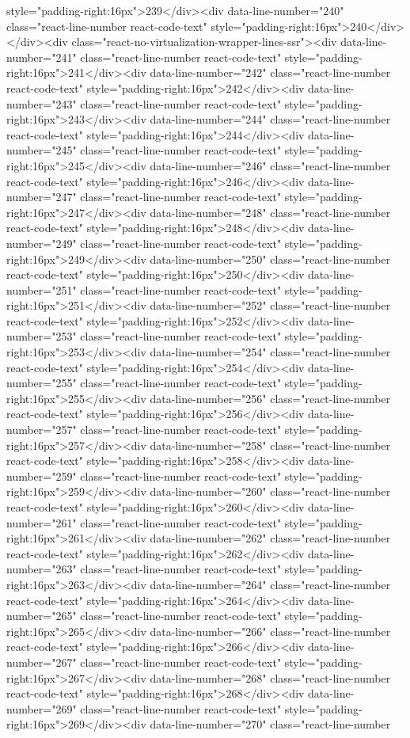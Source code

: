 {{{{{style="padding-right:16px">239</div><div data-line-number="240" class="react-line-number react-code-text" style="padding-right:16px">240</div></div><div class="react-no-virtualization-wrapper-lines-ssr"><div data-line-number="241" class="react-line-number react-code-text" style="padding-right:16px">241</div><div data-line-number="242" class="react-line-number react-code-text" style="padding-right:16px">242</div><div data-line-number="243" class="react-line-number react-code-text" style="padding-right:16px">243</div><div data-line-number="244" class="react-line-number react-code-text" style="padding-right:16px">244</div><div data-line-number="245" class="react-line-number react-code-text" style="padding-right:16px">245</div><div data-line-number="246" class="react-line-number react-code-text" style="padding-right:16px">246</div><div data-line-number="247" class="react-line-number react-code-text" style="padding-right:16px">247</div><div data-line-number="248" class="react-line-number react-code-text" style="padding-right:16px">248</div><div data-line-number="249" class="react-line-number react-code-text" style="padding-right:16px">249</div><div data-line-number="250" class="react-line-number react-code-text" style="padding-right:16px">250</div><div data-line-number="251" class="react-line-number react-code-text" style="padding-right:16px">251</div><div data-line-number="252" class="react-line-number react-code-text" style="padding-right:16px">252</div><div data-line-number="253" class="react-line-number react-code-text" style="padding-right:16px">253</div><div data-line-number="254" class="react-line-number react-code-text" style="padding-right:16px">254</div><div data-line-number="255" class="react-line-number react-code-text" style="padding-right:16px">255</div><div data-line-number="256" class="react-line-number react-code-text" style="padding-right:16px">256</div><div data-line-number="257" class="react-line-number react-code-text" style="padding-right:16px">257</div><div data-line-number="258" class="react-line-number react-code-text" style="padding-right:16px">258</div><div data-line-number="259" class="react-line-number react-code-text" style="padding-right:16px">259</div><div data-line-number="260" class="react-line-number react-code-text" style="padding-right:16px">260</div><div data-line-number="261" class="react-line-number react-code-text" style="padding-right:16px">261</div><div data-line-number="262" class="react-line-number react-code-text" style="padding-right:16px">262</div><div data-line-number="263" class="react-line-number react-code-text" style="padding-right:16px">263</div><div data-line-number="264" class="react-line-number react-code-text" style="padding-right:16px">264</div><div data-line-number="265" class="react-line-number react-code-text" style="padding-right:16px">265</div><div data-line-number="266" class="react-line-number react-code-text" style="padding-right:16px">266</div><div data-line-number="267" class="react-line-number react-code-text" style="padding-right:16px">267</div><div data-line-number="268" class="react-line-number react-code-text" style="padding-right:16px">268</div><div data-line-number="269" class="react-line-number react-code-text" style="padding-right:16px">269</div><div data-line-number="270" class="react-line-number }}}}}
